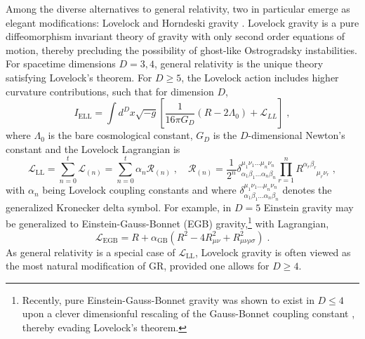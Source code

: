 \documentclass[amsmath,amssymb,11pt]{article}
\newcommand{\beq}{\begin{equation}}
\newcommand{\eeq}{\end{equation}}
\begin{document}
Among the diverse alternatives to general relativity, two in particular emerge as elegant modifications: Lovelock \cite{Lovelock:1971yv,Lovelock:1972vz} and Horndeski gravity \cite{Horndeski74-1}.  Lovelock gravity is a pure diffeomorphism invariant theory of gravity with only second order equations of motion, thereby precluding the possibility of ghost-like Ostrogradsky instabilities. For spacetime dimensions $D=3,4$, general relativity is the unique theory satisfying Lovelock's theorem. For $D\geq5$, the Lovelock action includes higher curvature contributions, such that for dimension $D$, 
\beq I_{\text{ELL}}=\int d^{D}x\sqrt{-g}\left[\frac{1}{16\pi G_{D}}(R-2\Lambda_{0})+\mathcal{L}_{LL}\right]\;,\label{ELLactionD}\eeq
where $\Lambda_{0}$ is the bare cosmological constant, $G_{D}$ is the $D$-dimensional Newton's constant and the Lovelock Lagrangian is 
\beq \mathcal{L}_{\text{LL}}=\sum_{n=0}^{t}\mathcal{L}_{(n)}=\sum_{n=0}^{t}\alpha_{n}\mathcal{R}_{(n)}\;,\quad \mathcal{R}_{(n)}=\frac{1}{2^{n}}\delta^{\mu_{1}\nu_{1}...\mu_{n}\nu_{n}}_{\alpha_{1}\beta_{1}...\alpha_{n}\beta_{n}}\prod_{r=1}^{n}R^{\alpha_{r}\beta_{r}}_{\;\;\;\;\;\;\;\mu_{r}\nu_{r}}\;,\eeq
with $\alpha_{n}$ being Lovelock coupling constants and where $\delta^{\mu_{1}\nu_{1}...\mu_{n}\nu_{n}}_{\alpha_{1}\beta_{1}...\alpha_{n}\beta_{n}}$ denotes the generalized Kronecker delta symbol. For example, in $D=5$ Einstein gravity may be generalized to Einstein-Gauss-Bonnet (EGB) gravity,\footnote{Recently, pure Einstein-Gauss-Bonnet gravity was shown to exist in $D\leq4$ upon a clever dimensionful rescaling of the Gauss-Bonnet coupling constant \cite{Glavan:2019inb}, thereby evading Lovelock's theorem.} with Lagrangian, 
\beq \mathcal{L}_{\text{EGB}}=R+\alpha_{\text{GB}}(R^{2}-4R_{\mu\nu}^{2}+R_{\mu\nu\rho\sigma}^{2})\;.\eeq
As general relativity is a special case of $\mathcal{L}_{\text{LL}}$, Lovelock gravity is often viewed as the most natural modification of GR, provided one allows for $D\geq4$.
\end{document}
